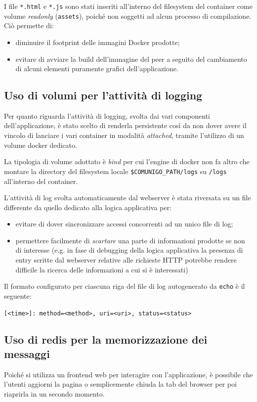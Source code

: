 \documentclass[conference]{IEEEtran}
\begin{document}
I file \texttt{*.html} e \texttt{*.js} sono stati inseriti all'interno del filesystem del container come volume \textit{readonly} (\texttt{assets}), poiché non soggetti ad alcun processo di compilazione. Ciò permette di:
\begin{itemize}
\item diminuire il footprint delle immagini Docker prodotte;
\item evitare di avviare la build dell'immagine del peer a seguito del cambiamento di alcuni elementi puramente grafici dell'applicazione.
\end{itemize}

\subsection{Uso di volumi per l'attività di logging}
Per quanto riguarda l'attività di logging, svolta dai vari componenti dell'applicazione, è stato scelto di renderla persistente così da non dover avere il vincolo di lanciare i vari container in modalità \textit{attached}, tramite l'utilizzo di un volume docker dedicato.

La tipologia di volume adottato è \textit{bind} per cui l'engine di docker non fa altro che montare la directory del filesystem locale \texttt{\$COMUNIGO\_PATH/logs} su \texttt{/logs} all'interno del container.

L'attività di log svolta automaticamente dal webserver è stata riversata su un file differente da quello dedicato alla logica applicativa per:
\begin{itemize}
\item evitare di dover sincronizzare accessi concorrenti ad un unico file di log;
\item permettere facilmente di \textit{scartare} una parte di informazioni prodotte se non di interesse (e.g. in fase di debugging della logica applicativa la presenza di entry scritte dal webserver relative alle richieste HTTP potrebbe rendere difficile la ricerca delle informazioni a cui si è interessati)
\end{itemize}

Il formato configurato per ciascuna riga del file di log autogenerato da \texttt{echo} è il seguente:

\centerline{\scriptsize\texttt{[<time>]: method=<method>, uri=<uri>, status=<status>}}

\subsection{Uso di redis per la memorizzazione dei messaggi}
Poiché si utilizza un frontend web per interagire con l'applicazione, è possibile che l'utenti aggiorni la pagina o semplicemente chiuda la tab del browser per poi riaprirla in un secondo momento.
\end{document}
